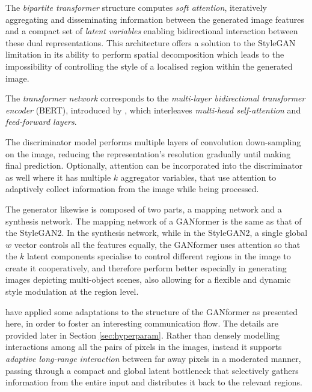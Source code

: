 \documentclass{article}
\begin{document}
The \textit{bipartite transformer} structure computes \textit{soft attention}, iteratively aggregating 
and disseminating information between the generated image features and a compact set of 
\textit{latent variables} enabling bidirectional interaction between these dual representations. 
This architecture offers a solution to the StyleGAN limitation in its ability to perform spatial 
decomposition which leads to the impossibility of controlling the style of a localised region 
within the generated image.

The \textit{transformer network} corresponds to the \textit{multi-layer bidirectional transformer 
	encoder} (BERT), introduced by \citet{devlin2019bert}, which interleaves \textit{multi-head 
	self-attention} and \textit{feed-forward layers}. 

The discriminator model performs multiple layers of convolution down-sampling on the image, 
reducing the representation's resolution gradually until making final prediction. 
Optionally, attention can be incorporated into the discriminator as well where it has multiple $k$ 
aggregator variables, that use attention to adaptively collect information from the image while being 
processed. 

The generator likewise is composed of two parts, a mapping network and a synthesis 
network. 
The mapping network of a GANformer is the same as that of the StyleGAN2.
In the synthesis network, while in the StyleGAN2, a single global $w$ vector controls all the 
features equally, the GANformer uses attention so that the $k$ latent components specialise to 
control different regions in the image to create it cooperatively, and therefore perform better 
especially in generating images depicting multi-object scenes, also allowing for a flexible and 
dynamic style modulation at the region level.

\citet{hudson2021generative} have applied some adaptations to the structure of the GANformer as 
presented here, in order to foster an interesting communication flow. The details are provided later 
in Section \ref{sec:hyperparam}.
Rather than densely modelling interactions among all the pairs of pixels in the images, instead it 
supports \textit{adaptive long-range interaction} between far away pixels in a moderated manner, 
passing through a compact and global latent bottleneck that selectively gathers information from 
the entire input and distributes it back to the relevant regions. 
\end{document}
